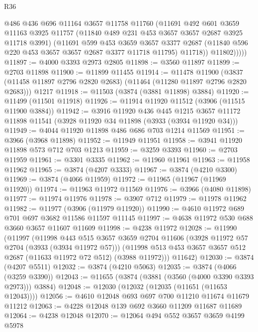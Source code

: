 \begin{lexlean}{R36}
\begin{coremodule}
              @486
              @436
              @696
              @11164
              @3657
              @11758
              @11760
              (@11691
                @492
                @601
                @3659
                @11163
                @3925
                @11757
                (@11840 @489 @231 @453 @3657 @3657 @2687 @3925 @11718 @3991)
                (@11691
                  @599
                  @453
                  @3659
                  @3657
                  @3377
                  @2687
                  (@11840 @596 @220 @453 @3657 @3657 @2687 @3377 @11718 @11795)
                  @11718))
              @11802)))))
@11897 := @4000 @3393 @2973 @2805
@11898 := @3560 @11897
@11899 := @2703 @11898
@11900 := @11899 @11455
@11914 := @11478
    @11900
    (@3837 (@11458 @11897 @2796 @2820 @2683) (@11464 (@11280 @11897 @2796 @2820 @2683)))
    @1217
@11918 := @11503 (@3874 (@3881 @11898) @3884)
@11920 := @11499 (@11501 @11918)
@11926 := @11914 @11920 @11512 (@3906 (@11515 @11900 @3884))
@11942 := @3916
    @11920
    @436
    @445
    @1215
    @3657
    @11172
    @11898
    @11541
    (@3928 @11920 @34 @11898 (@3933 (@3934 @11920 @34)))
@11949 := @4044 @11920 @11898 @486 @686 @703 @1214 @11569
@11951 := @3966 (@3968 @11898)
@11952 := @11949 @11951
@11958 := @3941 @11920 @11898 @573 @712 @703 @1213
@11959 := @3259 @3393
@11960 := @2703 @11959
@11961 := @3301 @3335
@11962 := @11960 @11961
@11963 := @11958 @11962
@11965 := @3874 (@4207 @3333)
@11967 := @3874 (@4210 @3300)
@11969 := @3874 (@4066 @11959)
@11972 := @11965 (@11967 (@11969 @11920))
@11974 := @11963 @11972 @11569
@11976 := @3966 (@4080 @11898)
@11977 := @11974 @11976
@11978 := @3907 @712
@11979 := @11978 @11962
@11982 := @11977 (@3906 (@11979 @11920))
@11990 := @4610 @11972 @689 @701 @697 @3682 @11586 @11597 @11145
@11997 := @4638 @11972 @530 @688 @3660 @3657 @11607 @11609
@11998 := @4238 @11972
@12028 := @11990
    (@11997
      (@11998
        @443
        @515
        @3657
        @3659
        @2704
        @11606
        (@3928 @11972 @57 @2704 (@3933 (@3934 @11972 @57)))
        (@11998 @513 @453 @3657 @3657 @512 @2687 (@11633 @11972 @72 @512) (@3988 @11972)))
      @11642)
@12030 := @3874 (@4207 @5511)
@12032 := @3874 (@4210 @5063)
@12035 := @3874 (@4066 (@3259 @3390))
@12043 := @11655 (@3874 (@3881 (@3560 (@4000 @3390 @3393 @2973))) @3884)
@12048 := @12030 (@12032 (@12035 (@11651 (@11653 @12043))))
@12056 := @4610 @12048 @693 @697 @700 @11210 @11674 @11679 @11212
@12063 := @4228 @12048 @139 @692 @3660 @11209 @11687 @11689
@12064 := @4238 @12048
@12070 := @12064 @494 @552 @3657 @3659 @4199 @5978

\end{coremodule}
\end{lexlean}
